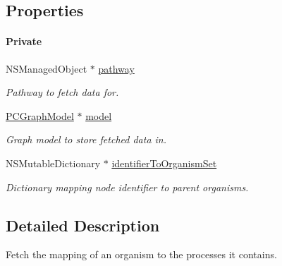 \subsection*{Properties}
\begin{Indent}\paragraph*{Private}
\begin{DoxyCompactItemize}
\item 
\hypertarget{interface_p_c_pathway_org_mapping_fetcher_aa98bd4f1252c3923e8f7cfd2426a8b65}{
NSManagedObject $\ast$ \hyperlink{interface_p_c_pathway_org_mapping_fetcher_aa98bd4f1252c3923e8f7cfd2426a8b65}{pathway}}
\label{interface_p_c_pathway_org_mapping_fetcher_aa98bd4f1252c3923e8f7cfd2426a8b65}

\begin{DoxyCompactList}\small\item\em Pathway to fetch data for. \end{DoxyCompactList}\item 
\hypertarget{interface_p_c_pathway_org_mapping_fetcher_a8e3ba255f13ba78fc7ec1ec3b5d53e84}{
\hyperlink{interface_p_c_graph_model}{PCGraphModel} $\ast$ \hyperlink{interface_p_c_pathway_org_mapping_fetcher_a8e3ba255f13ba78fc7ec1ec3b5d53e84}{model}}
\label{interface_p_c_pathway_org_mapping_fetcher_a8e3ba255f13ba78fc7ec1ec3b5d53e84}

\begin{DoxyCompactList}\small\item\em Graph model to store fetched data in. \end{DoxyCompactList}\item 
\hypertarget{interface_p_c_pathway_org_mapping_fetcher_aae0ebc2d9b74b47213bed31ef7ce197d}{
NSMutableDictionary $\ast$ \hyperlink{interface_p_c_pathway_org_mapping_fetcher_aae0ebc2d9b74b47213bed31ef7ce197d}{identifierToOrganismSet}}
\label{interface_p_c_pathway_org_mapping_fetcher_aae0ebc2d9b74b47213bed31ef7ce197d}

\begin{DoxyCompactList}\small\item\em Dictionary mapping node identifier to parent organisms. \end{DoxyCompactList}\end{DoxyCompactItemize}
\end{Indent}


\subsection{Detailed Description}
Fetch the mapping of an organism to the processes it contains. 


